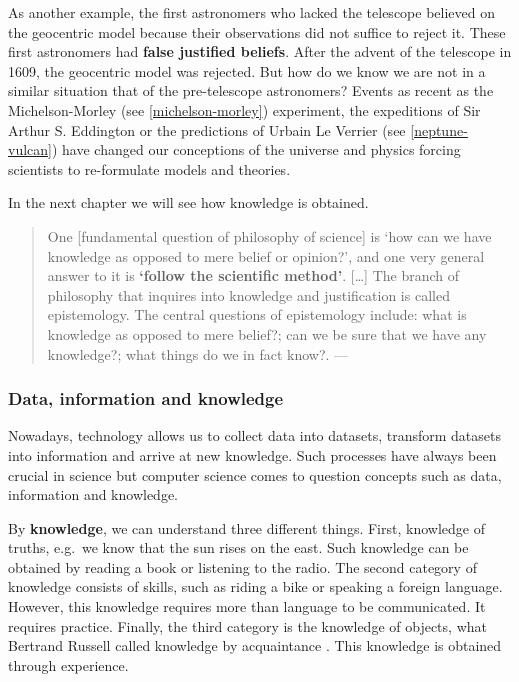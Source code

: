\documentclass[
]{book}
\begin{document}
As another example, the first astronomers who lacked the telescope believed on the geocentric model because their observations did not suffice to reject it. These first astronomers had \textbf{false justified beliefs}. After the advent of the telescope in 1609, the geocentric model was rejected. But how do we know we are not in a similar situation that of the pre-telescope astronomers? Events as recent as the Michelson-Morley (see \ref{michelson-morley}) experiment, the expeditions of Sir Arthur S. Eddington or the predictions of Urbain Le Verrier (see \ref{neptune-vulcan}) have changed our conceptions of the universe and physics forcing scientists to re-formulate models and theories.

In the next chapter we will see how knowledge is obtained.

\begin{quote}
One {[}fundamental question of philosophy of science{]} is `how can we have knowledge as opposed to mere belief or opinion?', and one very general answer to it is \textbf{`follow the scientific method'}. {[}\ldots{]} The branch of philosophy that inquires into knowledge and justification is called epistemology. The central questions of epistemology include: what is knowledge as opposed to mere belief?; can we be sure that we have any knowledge?; what things do we in fact know?. --- \citep{ladyman2012understanding}
\end{quote}

\hypertarget{data-information-and-knowledge}{%
\subsubsection{Data, information and knowledge}\label{data-information-and-knowledge}}

Nowadays, technology allows us to collect data into datasets, transform datasets into information and arrive at new knowledge. Such processes have always been crucial in science but computer science comes to question concepts such as data, information and knowledge. \citep{johansson2016philosophy}

By \textbf{knowledge}, we can understand three different things. First, knowledge of truths, e.g.~we know that the sun rises on the east. Such knowledge can be obtained by reading a book or listening to the radio.
The second category of knowledge consists of skills, such as riding a bike or speaking a foreign language. However, this knowledge requires more than language to be communicated. It requires practice.
Finally, the third category is the knowledge of objects, what Bertrand Russell called knowledge by acquaintance \citep{russell2001problems}. This knowledge is obtained through experience.
\end{document}
